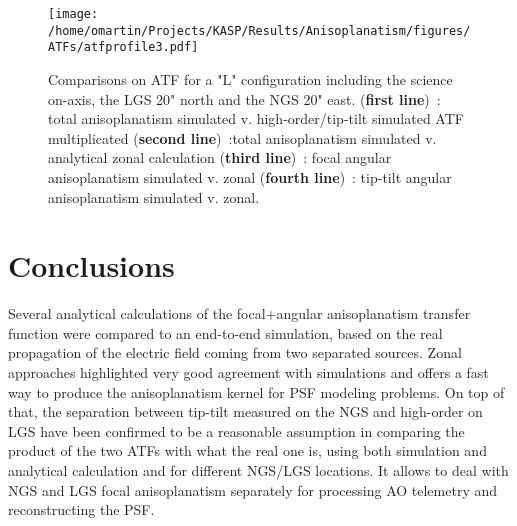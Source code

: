\documentclass[12pt]{article}
\begin{document}
\begin{figure}[h!] \label{F:atf2}
	\centering
	\texttt{[image: /home/omartin/Projects/KASP/Results/Anisoplanatism/figures/ATFs/atfprofile3.pdf]}
	\caption{Comparisons on ATF for a "L" configuration including the science on-axis, the LGS 20" north and the NGS 20" east. (\textbf{first line})~: total anisoplanatism simulated v. high-order/tip-tilt simulated ATF multiplicated  (\textbf{second line})~:total anisoplanatism simulated v. analytical zonal calculation (\textbf{third line})~: focal angular anisoplanatism simulated v. zonal (\textbf{fourth line})~: tip-tilt angular anisoplanatism simulated v. zonal.}
\end{figure}
	

\section{Conclusions}

Several analytical calculations of the focal+angular anisoplanatism transfer function were compared to an end-to-end simulation, based on the real propagation of the electric field coming from two separated sources. Zonal approaches highlighted very good agreement with simulations and offers a fast way to produce the anisoplanatism kernel for PSF modeling problems. On top of that, the separation between tip-tilt measured on the NGS and high-order on LGS have been confirmed to be a reasonable assumption in comparing the product of the two ATFs with what the real one is, using both simulation and analytical calculation and for different NGS/LGS locations. It allows to deal with NGS and LGS focal anisoplanatism separately for processing AO telemetry and reconstructing the PSF.

 

\end{document}
